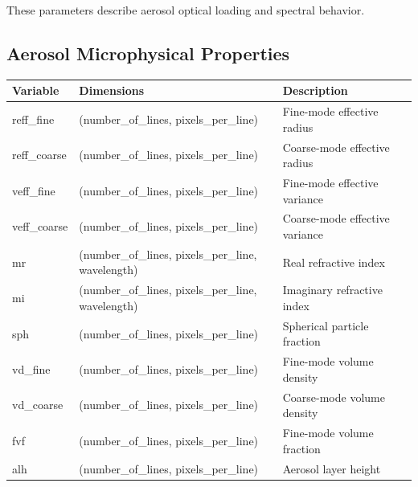 \documentclass[
  letterpaper,
]{scrbook}
\begin{document}
These parameters describe aerosol optical loading and spectral behavior.

\subsection{Aerosol Microphysical
Properties}\label{aerosol-microphysical-properties}

\begin{longtable}[]{@{}
  >{\raggedright\arraybackslash}p{}
  >{\raggedright\arraybackslash}p{}
  >{\raggedright\arraybackslash}p{}@{}}
\toprule\noalign{}
\begin{minipage}[b]{\linewidth}\raggedright
Variable
\end{minipage} & \begin{minipage}[b]{\linewidth}\raggedright
Dimensions
\end{minipage} & \begin{minipage}[b]{\linewidth}\raggedright
Description
\end{minipage} \\
\midrule\noalign{}
\endhead
\bottomrule\noalign{}
\endlastfoot
reff\_fine & (number\_of\_lines, pixels\_per\_line) & Fine-mode
effective radius \\
reff\_coarse & (number\_of\_lines, pixels\_per\_line) & Coarse-mode
effective radius \\
veff\_fine & (number\_of\_lines, pixels\_per\_line) & Fine-mode
effective variance \\
veff\_coarse & (number\_of\_lines, pixels\_per\_line) & Coarse-mode
effective variance \\
mr & (number\_of\_lines, pixels\_per\_line, wavelength) & Real
refractive index \\
mi & (number\_of\_lines, pixels\_per\_line, wavelength) & Imaginary
refractive index \\
sph & (number\_of\_lines, pixels\_per\_line) & Spherical particle
fraction \\
vd\_fine & (number\_of\_lines, pixels\_per\_line) & Fine-mode volume
density \\
vd\_coarse & (number\_of\_lines, pixels\_per\_line) & Coarse-mode volume
density \\
fvf & (number\_of\_lines, pixels\_per\_line) & Fine-mode volume
fraction \\
alh & (number\_of\_lines, pixels\_per\_line) & Aerosol layer height \\
\end{longtable}
\end{document}
